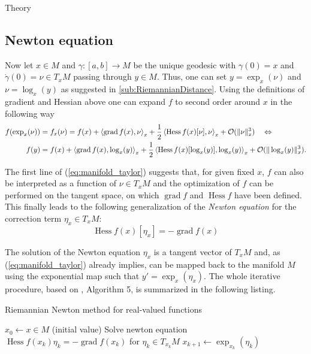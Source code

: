 \begin{chapter}{Theory}
\subsection{Newton equation} %
\label{sub:Newton equation}
Now let $x\in M$ and $\gamma:[a,b] \to M$ be the unique geodesic with $\gamma(0)=x$ and $\dot{\gamma}(0)=\nu\in T_xM$ 
passing through $y\in M$. Thus, one can set $y=\exp_x(\nu)$ and $\nu=\log_x(y)$ as suggested in \ref{sub:RiemannianDistance}. Using the
definitions of gradient and Hessian above one can expand $f$ to second order around $x$ in the following way
\begin{align}
    \label{eq:manifold_taylor}
    f(\exp_x(\nu)) &= f_x(\nu) = f(x) + \left\langle \operatorname{grad}f(x),\nu \right\rangle_x + \frac{1}{2}\left\langle \operatorname{Hess}f(x)[\nu],\nu \right\rangle_x + \mathcal{O}(\| \nu \|_x^3)\quad \Leftrightarrow \\
    f(y) &= f(x) + \left\langle \operatorname{grad}f(x),\log_x(y) \right\rangle_x + \frac{1}{2}\left\langle \operatorname{Hess}f(x)[\log_x(y)],\log_x(y) \right\rangle_x + \mathcal{O}(\| \log_x(y) \|_x^3).\nonumber
\end{align}

The first line of (\ref{eq:manifold_taylor}) suggests that, for given fixed $x$, $f$ can also be interpreted as a function of $\nu\in T_xM$ and the optimization of $f$ can be 
performed on the tangent space, on which $\operatorname{grad}f$ and $\operatorname{Hess}f$ have been defined. 
This finally leads to the following generalization of the \emph{Newton equation}
for the correction term $\eta_x \in T_xM$:
\begin{equation}
    \label{eq:newtoneq}
    \operatorname{Hess}f(x)[\eta_x]=-\operatorname{grad}f(x)
\end{equation}

The solution of the Newton equation $\eta_x$ is a tangent vector of $T_xM$ and, as (\ref{eq:manifold_taylor}) already implies, can be mapped back to the manifold $M$ 
using the exponential map such that $y'=\exp_x(\eta_x)$. The whole iterative procedure, based on \cite{Absil2009}, Algorithm 5, is summarized in the following listing.
\begin{algorithm}
\caption{Riemannian Newton method for real-valued functions}
\label{al:real_riemannian_newton}
\begin{algorithmic}
\STATE $x_0 \leftarrow x\in M$ (initial value)
\STATE Solve newton equation $\operatorname{Hess} f(x_k)\eta_k = -\operatorname{grad} f(x_k)$ for $\eta_k\in T_{x_k}M$
\STATE $x_{k+1} \leftarrow \exp_{x_k}(\eta_k)$
\ENDFOR
\end{algorithmic}
\end{algorithm}


\end{chapter}
